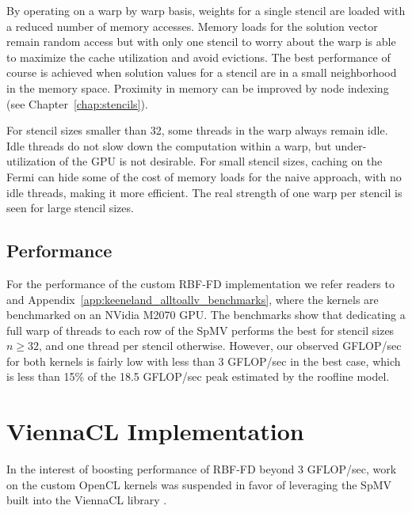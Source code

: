 \documentclass{report}
\begin{document}
By operating on a warp by warp basis, weights for a single stencil are loaded with a reduced number of memory accesses. Memory loads for the solution vector remain random access but with only one stencil to worry about the warp is able to maximize the cache utilization and avoid evictions. %
The best performance of course is achieved when solution values for a stencil are in a small neighborhood in the memory space. Proximity in memory can be improved by node indexing (see Chapter~\ref{chap:stencils}). 

For stencil sizes smaller than 32, some threads in the warp always remain idle. Idle threads do not slow down the computation within a warp, but under-utilization of the GPU is not desirable. For small stencil sizes, caching on the Fermi can hide some of the cost of memory loads for the naive approach, with no idle threads, making it more efficient. The real strength of one warp per stencil is seen for large stencil sizes. 

\subsection{Performance}

For the performance of the custom RBF-FD implementation we refer readers to \cite{BolligFlyerErlebacher2012} and Appendix~\ref{app:keeneland_alltoallv_benchmarks}, where the kernels are benchmarked on an NVidia M2070 GPU. The benchmarks show that dedicating a full warp of threads to each row of the SpMV performs the best for stencil sizes $n \geq 32$, and one thread per stencil otherwise. However, our observed GFLOP/sec for both kernels is fairly low with less than 3 GFLOP/sec in the best case, which is less than 15\% of the 18.5 GFLOP/sec peak estimated by the roofline model. 


\section{ViennaCL Implementation} 

In the interest of boosting performance of RBF-FD beyond 3 GFLOP/sec, work on the custom OpenCL kernels was suspended in favor of leveraging the SpMV built into the ViennaCL library \cite{Rupp2010, Rupp2010a}.  
\end{document}
